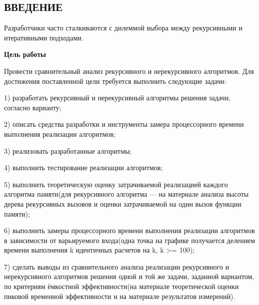 \documentclass[14pt]{article}
\begin{document}
	\newpage
	\begin{center}
		\section*{\foreignlanguage{russian}{ВВЕДЕНИЕ}} 
	\end{center}
		
	Разработчики часто сталкиваются с дилеммой выбора между рекурсивными и итеративными подходами.\par
	\textbf{Цель работы}\par
	Провести сравнительный анализ рекурсивного и нерекурсивного алгоритмов.
	Для достижения поставленной цели требуется выполнить следующие задачи:\par
	1) разработать рекурсивный и нерекурсивный алгоритмы решения задачи, согласно варианту;\par
	2) описать средства разработки и инструменты замера процессорного времени выполнения реализации алгоритмов;\par
	3) реализовать разработанные алгоритмы;\par
	4) выполнить тестирование реализации алгоритмов;\par
	5) выполнить теоретическую оценку затрачиваемой реализацией каждого алгоритма памяти(для рекурсивного алгоритма --- на материале анализа высоты дерева рекурсивных вызовов и оценки затрачиваемой на один вызов функции памяти);\par
	6) выполнить замеры процессорного времени выполнения реализации алгоритмов в зависимости от варьируемого входа(одна точка на графике получается делением времени выполнения k идентичных расчетов на k, k >= 100);\par
	7) сделать выводы из сравнительного анализа реализации рекурсивного и нерекурсивного алгоритмов решения одной и той же задачи, заданной вариантом, по критериям ёмкостной эффективности(на материале теоретической оценки пиковой временной эффективности и на материале результатов измерений).
	\newpage
\end{document}
